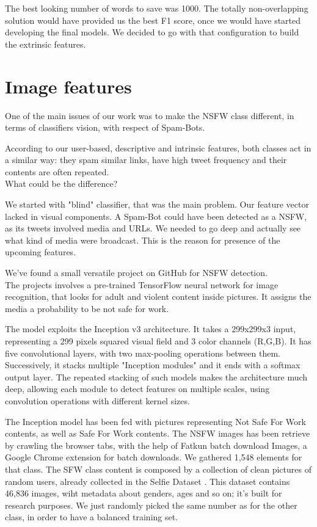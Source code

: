 The best looking number of words to save was 1000. The totally non-overlapping solution would have provided us the best F1 score, once we would have started developing the final models. We decided to go with that configuration to build the extrinsic features. 


\section{Image features}
One of the main issues of our work was to make the NSFW class different, in terms of classifiers vision, with respect of Spam-Bots.

According to our user-based, descriptive and intrinsic features, both classes act in a similar way: they spam similar links, have high tweet frequency and their contents are often repeated.\\
What could be the difference?

We started with "blind" classifier, that was the main problem. Our feature vector lacked in visual components. A Spam-Bot could have been detected as a NSFW, as its tweets involved media and URLs. We needed to go deep and actually see what kind of media were broadcast.
This is the reason for presence of the upcoming features.

We've found a small versatile project on GitHub for NSFW detection.\\
The projects involves a pre-trained TensorFlow neural network for image recognition, that looks for adult and violent content inside pictures. It assigns the media a probability to be not safe for work.

The model exploits the Inception v3 \cite{inception} architecture.
It takes a 299x299x3 input, representing a 299 pixels squared visual field and 3 color channels (R,G,B). It has five convolutional layers, with two max-pooling operations between them. Successively, it stacks multiple "Inception modules" and it ends with a softmax output layer.
The repeated stacking of such models makes the architecture much deep, allowing each module to detect features on multiple scales, using convolution operations with different kernel sizes.


The Inception model has been fed with pictures representing Not Safe For Work contents, as well as Safe For Work contents.
The NSFW images has been retrieve by crawling the browser tabs, with the help of Fatkun batch download Images, a Google Chrome extension for batch downloads.
We gathered 1,548 elements for that class.
The SFW class content is composed by a collection of clean pictures of random users, already collected in the Selfie Dataset \cite{selfie} . This dataset contains 46,836 images, wiht metadata about genders, ages and so on; it's built for research purposes.
We just randomly picked the same number as for the other class, in order to have a balanced training set.

